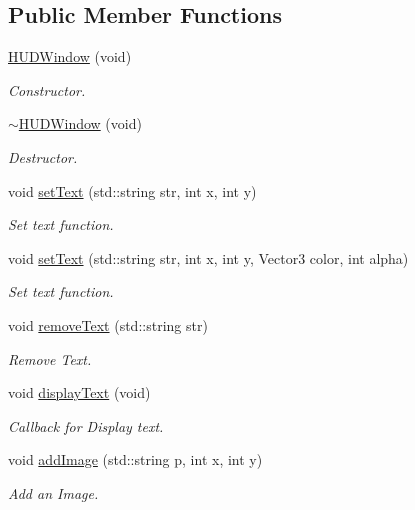 \subsection*{Public Member Functions}
\begin{DoxyCompactItemize}
\item 
\hyperlink{class_h_u_d_window_a8d97402012deb77be8008cfed176fdd6}{H\-U\-D\-Window} (void)
\begin{DoxyCompactList}\small\item\em Constructor. \end{DoxyCompactList}\item 
\hyperlink{class_h_u_d_window_ac1c288c91430729735038fcefc4bcdb8}{$\sim$\-H\-U\-D\-Window} (void)
\begin{DoxyCompactList}\small\item\em Destructor. \end{DoxyCompactList}\item 
void \hyperlink{class_h_u_d_window_a77a524e42af9d069137b70a1e5653df1}{set\-Text} (std\-::string str, int x, int y)
\begin{DoxyCompactList}\small\item\em Set text function. \end{DoxyCompactList}\item 
void \hyperlink{class_h_u_d_window_ade8fc1411dee1078b26498370bbef672}{set\-Text} (std\-::string str, int x, int y, Vector3 color, int alpha)
\begin{DoxyCompactList}\small\item\em Set text function. \end{DoxyCompactList}\item 
void \hyperlink{class_h_u_d_window_a0aedfd1f3c8354da1b69f1b592d4ad3e}{remove\-Text} (std\-::string str)
\begin{DoxyCompactList}\small\item\em Remove Text. \end{DoxyCompactList}\item 
void \hyperlink{class_h_u_d_window_a12148d8845eaa5a663d816a4befba0dd}{display\-Text} (void)
\begin{DoxyCompactList}\small\item\em Callback for Display text. \end{DoxyCompactList}\item 
void \hyperlink{class_h_u_d_window_a94366d6f68535133a56d0b38228460e0}{add\-Image} (std\-::string p, int x, int y)
\begin{DoxyCompactList}\small\item\em Add an Image. \end{DoxyCompactList}\item 

\end{DoxyCompactItemize}
